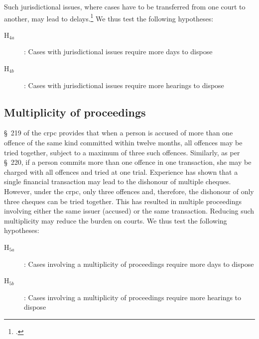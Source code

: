 Such jurisdictional issues, where cases have to be transferred from one court to another, may lead to delays.\footcite{sc2020_138, amicus2020_submission} We thus test the following hypotheses:

\begin{description}
\item[H$_{4a}$]: Cases with jurisdictional issues require more days to dispose
\item[H$_{4b}$]: Cases with jurisdictional issues require more hearings to dispose
\end{description}

\subsection{Multiplicity of proceedings}

\S~219 of the \gls{crpc} provides that when a person is accused of more than one offence of the same kind committed within twelve months, all offences may be tried together, subject to a maximum of three such offences. Similarly, as per \S~220, if a person commits more than one offence in one transaction, she may be charged with all offences and tried at one trial. Experience has shown that a single financial transaction may lead to the dishonour of multiple cheques. However, under the \gls{crpc}, only three offences and, therefore, the dishonour of only three cheques can be tried together. This has resulted in multiple proceedings involving either the same issuer (accused) or the same transaction. Reducing such multiplicity may reduce the burden on courts. We thus test the following hypotheses:

\begin{description}
\item[H$_{5a}$]: Cases involving a multiplicity of proceedings require more days to dispose
\item[H$_{5b}$]: Cases involving a multiplicity of proceedings require more hearings to dispose
\end{description}

